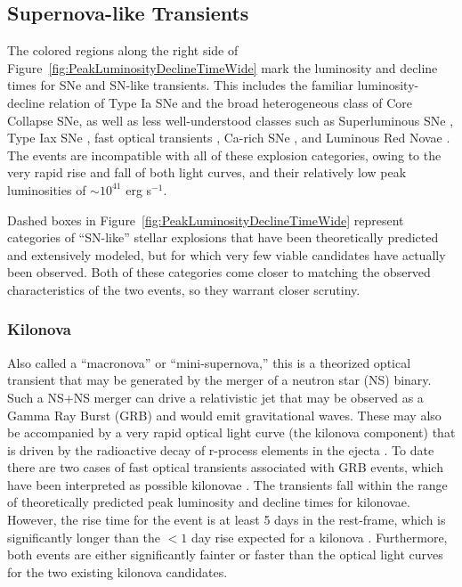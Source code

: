 \subsection{Supernova-like Transients}

The colored regions along the right side of
Figure~\ref{fig:PeakLuminosityDeclineTimeWide} mark the luminosity and
decline times for SNe and SN-like transients. This includes the
familiar luminosity-decline relation of Type Ia SNe
\citep{Phillips:1993} and the broad heterogeneous class of Core
Collapse SNe, as well as less well-understood classes such as
Superluminous SNe \citep{Gal-Yam:2012,Arcavi:2016}, Type Iax SNe
\citep{Foley:2013a}, fast optical transients \citep{Drout:2014}, Ca-rich SNe \citep{Filippenko:2003,Perets:2011,Kasliwal:2012}, and
Luminous Red Novae \citep[also called intermediate luminosity red
  transients;][]{Munari:2002,Kulkarni:2007,Kasliwal:2011b}.  The \spock
events are incompatible with all of these explosion categories,
owing to the very rapid rise and fall of both \spock light curves, and
their relatively low peak luminosities of $\sim10^{41}$ erg s$^{-1}$.

Dashed boxes in Figure~\ref{fig:PeakLuminosityDeclineTimeWide}
represent categories of ``SN-like'' stellar explosions that have been
theoretically predicted and extensively modeled, but for which very
few viable candidates have actually been observed. Both of these
categories come closer to matching the observed characteristics of the
two \spock events, so they warrant closer scrutiny.

\subsubsection{Kilonova}

Also called a ``macronova'' or ``mini-supernova,'' this is a theorized
optical transient that may be generated by the merger of a neutron
star (NS) binary. Such a NS+NS merger can drive a relativistic jet that may be
observed as a Gamma Ray Burst (GRB) and would emit gravitational
waves.  These may also be accompanied by a very rapid optical light
curve (the kilonova component) that is driven by the radioactive decay
of r-process elements in the ejecta \citep{Li:1998,Kulkarni:2005}.  To
date there are two cases of fast optical transients associated with
GRB events, which have been interpreted as possible kilonovae
\citep{Perley:2009,Tanvir:2013}.  The \spock transients fall within
the range of theoretically predicted peak luminosity and decline times
for kilonovae. However, the rise time for the \spockone event is at
least 5 days in the rest-frame, which is significantly longer than the
$<1$ day rise expected for a kilonova
\citep[e.g.][]{Metzger:2010,Barnes:2013,Kasen:2015}.  Furthermore,
both \spock events are either significantly fainter or faster than the
optical light curves for the two existing kilonova candidates.

